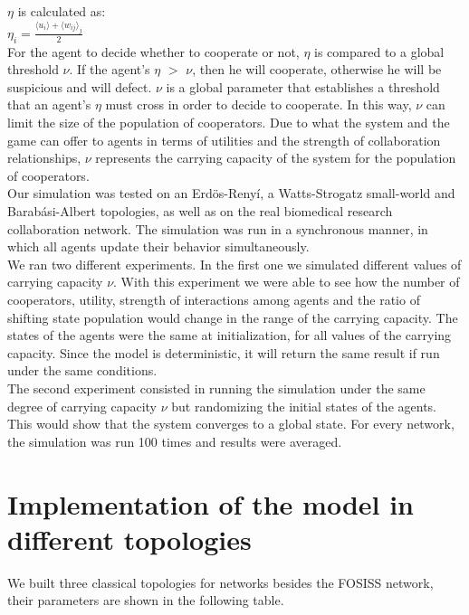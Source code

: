 \documentclass{bmcart}
\begin{document}
$\eta$ is calculated as:\\ 


$\eta_i = \frac{\langle u_i \rangle + \langle w_{ij} \rangle _j}{2}$\\

For the agent to decide whether to cooperate or not, $\eta$ is
compared to a global threshold $\nu$. If the agent's $\eta$ $>$ $\nu$,
then he will cooperate, otherwise he will be suspicious and
will defect. $\nu$ is a global parameter that establishes a threshold
that an agent's $\eta$ must cross in order to decide to cooperate. In
this way, $\nu$ can limit the size of the population of
cooperators. Due to what the system and the game can offer to agents
in terms of utilities and the strength of collaboration relationships,
$\nu$ represents the carrying capacity of the
system for the population of cooperators.\\


Our simulation was tested on an Erd\"{o}s-Reny\'i, a
Watts-Strogatz small-world and Barab\'asi-Albert topologies, as well
as on the real biomedical research collaboration network. The
simulation was run in a synchronous manner, in which all agents update their
behavior simultaneously. \\   

We ran two different experiments. In the first one we simulated different
values of carrying capacity $\nu$. With this experiment we were able
to see how the number of cooperators, utility, strength of interactions
among agents and the ratio of shifting state population would change
in the range of the carrying capacity. The states of the agents were
the same at initialization, for all values of the carrying
capacity. Since the model is deterministic, it will return the same
result if run under the same conditions.\\

The second experiment consisted in running the simulation under the
same degree of carrying capacity $\nu$ but randomizing the initial
states of the agents. This would show that the system converges to a
global state. For every network, the simulation was run 100 times and
results were averaged.

\section*{Implementation of the model in different topologies}

We built three classical topologies for networks besides the FOSISS network, their parameters are shown in the following table.\\
\end{document}
